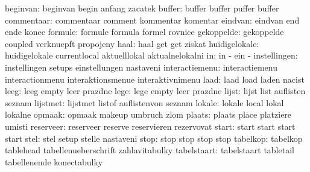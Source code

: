            beginvan:  beginvan             begin               anfang
                      zacatek
             buffer:  buffer               buffer              puffer
                      buffer
         commentaar:  commentaar           comment             kommentar
                      komentar
            eindvan:  eindvan              end                 ende
                      konec
            formule:  formule              formula             formel
                      rovnice
         gekoppelde:  gekoppelde           coupled             verknuepft
                      propojeny
               haal:  haal                 get                 get
                      ziskat
      huidigelokale:  huidigelokale        currentlocal        aktuelllokal
                      aktualnelokalni
                 in:  in                   -                   ein
                      - %
       instellingen:  instellingen         setups              einstellungen
                      nastaveni
     interactiemenu:  interactiemenu       interactionmenu     interaktionsmenue
                      interaktivnimenu
               laad:  laad                 load                laden
                      nacist
               leeg:  leeg                 empty               leer
                      prazdne
               lege:  lege                 empty               leer
                      prazdne
              lijst:  lijst                list                auflisten
                      seznam
           lijstmet:  lijstmet             listof              auflistenvon
                      seznam
             lokale:  lokale               local               lokal
                      lokalne
             opmaak:  opmaak               makeup              umbruch
                      zlom
             plaats:  plaats               place               platziere
                      umisti %
          reserveer:  reserveer            reserve             reservieren
                      rezervovat
              start:  start                start               start
                      start
               stel:  stel                 setup               stelle
                      nastaveni
               stop:  stop                 stop                stop
                      stop
           tabelkop:  tabelkop             tablehead           tabellenueberschrift
                      zahlavitabulky
        tabelstaart:  tabelstaart          tabletail           tabellenende
                      konectabulky

